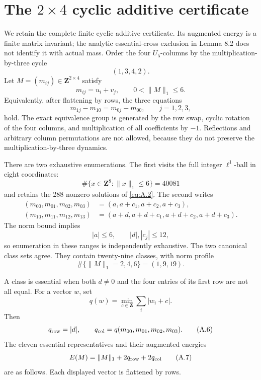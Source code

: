 \documentclass[11pt]{amsart}
\numberwithin{theorem}{section}
\theoremstyle{remark}
\numberwithin{equation}{section}
\begin{document}
\appendix
\section{The \texorpdfstring{\(2\times4\)}{2 x 4} cyclic additive certificate}\label{sec:appA}

We retain the complete finite cyclic additive certificate. Its augmented
energy is a finite matrix invariant; the analytic essential-cross
exclusion in Lemma 8.2 does not identify it with actual mass. Order the four
\(U_5\)-columns by the multiplication-by-three cycle
\[
 (1,3,4,2).
\]
Let \(M=(m_{ij})\in\mathbf Z^{2\times4}\) satisfy
\[
 m_{ij}=u_i+v_j,
 \qquad
 0<\|M\|_1\le6.
\tag{A.1}\label{eq:A.1}
\]
Equivalently, after flattening by rows, the three equations
\[
 m_{1j}-m_{10}=m_{0j}-m_{00},
 \qquad j=1,2,3,
\tag{A.2}\label{eq:A.2}
\]
hold.  The exact equivalence group is generated by the row swap, cyclic
rotation of the four columns, and multiplication of all coefficients by
\(-1\).  Reflections and arbitrary column permutations are not allowed,
because they do not preserve the multiplication-by-three dynamics.

There are two exhaustive enumerations.  The first visits the full integer
\(\ell^1\)-ball in eight coordinates:
\[
 \#\{x\in\mathbf Z^8:\|x\|_1\le6\}=40081
\]
and retains the 288 nonzero solutions of \eqref{eq:A.2}.  The second writes
\[
\begin{aligned}
(m_{00},m_{01},m_{02},m_{03})
   &=(a,a+c_1,a+c_2,a+c_3),\\
(m_{10},m_{11},m_{12},m_{13})
   &=(a+d,a+d+c_1,a+d+c_2,a+d+c_3).
\end{aligned}
\tag{A.3}\label{eq:A.3}
\]
The norm bound implies
\[
 |a|\le6,\qquad |d|,|c_j|\le12,
\]
so enumeration in these ranges is independently exhaustive.  The two
canonical class sets agree.  They contain twenty-nine classes, with norm
profile
\[
 \#\{\|M\|_1=2,4,6\}=(1,9,19).
\tag{A.4}\label{eq:A.4}
\]

A class is essential when both \(d\ne0\) and the four entries of its first
row are not all equal.  For a vector \(w\), set
\[
 q(w)=\min_{c\in\mathbf Z}\sum_i|w_i+c|.
\tag{A.5}\label{eq:A.5}
\]
Then
\[
 q_{\rm row}=|d|,
 \qquad
 q_{\rm col}=q(m_{00},m_{01},m_{02},m_{03}).
\tag{A.6}\label{eq:A.6}
\]
The eleven essential representatives and their augmented energies
\[
 E(M)=\|M\|_1+2q_{\rm row}+2q_{\rm col}
\tag{A.7}\label{eq:A.7}
\]
are as follows.  Each displayed vector is flattened by rows.
\end{document}
